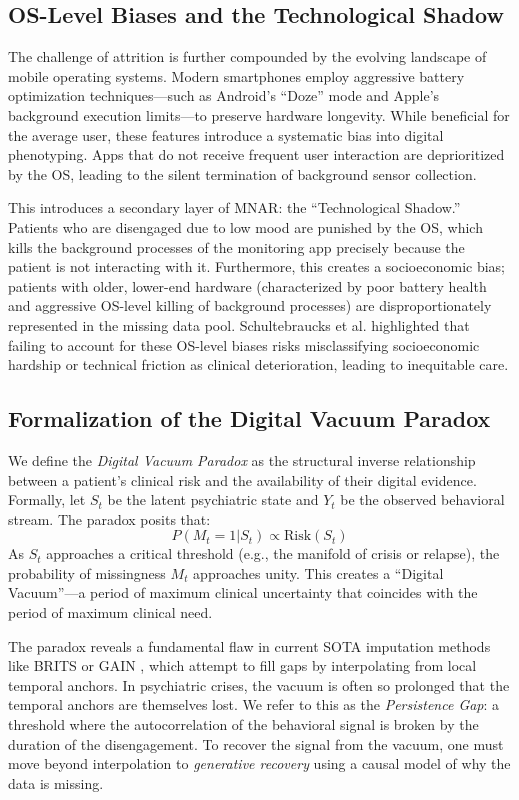 \subsection{OS-Level Biases and the Technological Shadow}
The challenge of attrition is further compounded by the evolving landscape of mobile operating systems. Modern smartphones employ aggressive battery optimization techniques—such as Android's ``Doze'' mode and Apple's background execution limits—to preserve hardware longevity. While beneficial for the average user, these features introduce a systematic bias into digital phenotyping. Apps that do not receive frequent user interaction are deprioritized by the OS, leading to the silent termination of background sensor collection.

This introduces a secondary layer of MNAR: the ``Technological Shadow.'' Patients who are disengaged due to low mood are punished by the OS, which kills the background processes of the monitoring app precisely because the patient is not interacting with it. Furthermore, this creates a socioeconomic bias; patients with older, lower-end hardware (characterized by poor battery health and aggressive OS-level killing of background processes) are disproportionately represented in the missing data pool. Schultebraucks et al. \cite{schultebraucks2025llms} highlighted that failing to account for these OS-level biases risks misclassifying socioeconomic hardship or technical friction as clinical deterioration, leading to inequitable care.

\subsection{Formalization of the Digital Vacuum Paradox}
We define the \textit{Digital Vacuum Paradox} as the structural inverse relationship between a patient's clinical risk and the availability of their digital evidence. Formally, let $S_t$ be the latent psychiatric state and $Y_t$ be the observed behavioral stream. The paradox posits that:
\begin{equation}
    P(M_t = 1 | S_t) \propto \text{Risk}(S_t)
\end{equation}
As $S_t$ approaches a critical threshold (e.g., the manifold of crisis or relapse), the probability of missingness $M_t$ approaches unity. This creates a ``Digital Vacuum''—a period of maximum clinical uncertainty that coincides with the period of maximum clinical need.

The paradox reveals a fundamental flaw in current SOTA imputation methods like BRITS \cite{cao2018brits} or GAIN \cite{yoon2018gain}, which attempt to fill gaps by interpolating from local temporal anchors. In psychiatric crises, the vacuum is often so prolonged that the temporal anchors are themselves lost. We refer to this as the \textit{Persistence Gap}: a threshold where the autocorrelation of the behavioral signal is broken by the duration of the disengagement. To recover the signal from the vacuum, one must move beyond interpolation to \textit{generative recovery} using a causal model of why the data is missing.

